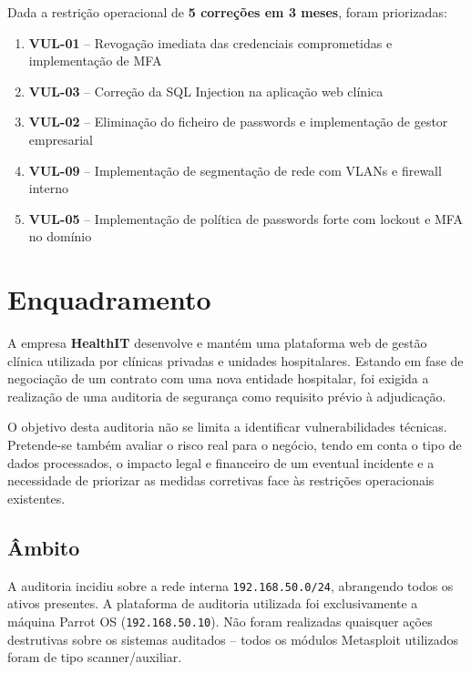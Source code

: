 \documentclass[12pt, a4paper]{report}
\begin{document}
Dada a restrição operacional de \textbf{5 correções em 3 meses}, foram priorizadas:

\begin{enumerate}[leftmargin=*,itemsep=2pt]
  \item \textbf{VUL-01} -- Revogação imediata das credenciais comprometidas e implementação de MFA
  \item \textbf{VUL-03} -- Correção da SQL Injection na aplicação web clínica
  \item \textbf{VUL-02} -- Eliminação do ficheiro de passwords e implementação de gestor empresarial
  \item \textbf{VUL-09} -- Implementação de segmentação de rede com VLANs e firewall interno
  \item \textbf{VUL-05} -- Implementação de política de passwords forte com lockout e MFA no domínio
\end{enumerate}

\chapter{Enquadramento}

A empresa \textbf{HealthIT} desenvolve e mantém uma plataforma web de gestão clínica utilizada
por clínicas privadas e unidades hospitalares. Estando em fase de negociação de um contrato com
uma nova entidade hospitalar, foi exigida a realização de uma auditoria de segurança como
requisito prévio à adjudicação.

O objetivo desta auditoria não se limita a identificar vulnerabilidades técnicas. Pretende-se
também avaliar o risco real para o negócio, tendo em conta o tipo de dados processados, o impacto
legal e financeiro de um eventual incidente e a necessidade de priorizar as medidas corretivas
face às restrições operacionais existentes.

\section{Âmbito}

A auditoria incidiu sobre a rede interna \texttt{192.168.50.0/24}, abrangendo todos os ativos
presentes. A plataforma de auditoria utilizada foi exclusivamente a máquina Parrot OS
(\texttt{192.168.50.10}). Não foram realizadas quaisquer ações destrutivas sobre os sistemas
auditados -- todos os módulos Metasploit utilizados foram de tipo scanner/auxiliar.
\end{document}
